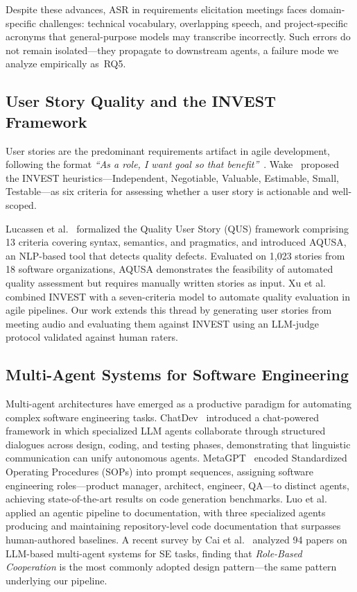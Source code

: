 \documentclass[sigconf]{acmart}
\begin{document}
Despite these advances, ASR in requirements elicitation meetings faces
domain-specific challenges: technical vocabulary, overlapping speech,
and project-specific acronyms that general-purpose models may
transcribe incorrectly. Such errors do not remain isolated—they
propagate to downstream agents, a failure mode we analyze empirically
as~RQ5.

\subsection{User Story Quality and the INVEST Framework}

User stories are the predominant requirements artifact in agile
development, following the format \textit{``As a role, I want goal so
that benefit''}~\cite{lucassen2016qus}. Wake~\cite{wake2003invest}
proposed the INVEST heuristics—Independent, Negotiable, Valuable,
Estimable, Small, Testable—as six criteria for assessing whether a
user story is actionable and well-scoped.

Lucassen et al.~\cite{lucassen2016qus} formalized the Quality User
Story (QUS) framework comprising 13 criteria covering syntax,
semantics, and pragmatics, and introduced AQUSA, an NLP-based tool
that detects quality defects. Evaluated on 1,023 stories from 18
software organizations, AQUSA demonstrates the feasibility of
automated quality assessment but requires manually written stories as
input. Xu et al.~\cite{xu2023requirement} combined INVEST with a
seven-criteria model to automate quality evaluation in agile
pipelines. Our work extends this thread by generating user stories
from meeting audio and evaluating them against INVEST using an
LLM-judge protocol validated against human raters.

\subsection{Multi-Agent Systems for Software Engineering}

Multi-agent architectures have emerged as a productive paradigm for
automating complex software engineering tasks. ChatDev~\cite{qian2024chatdev}
introduced a chat-powered framework in which specialized LLM agents
collaborate through structured dialogues across design, coding, and
testing phases, demonstrating that linguistic communication can
unify autonomous agents. MetaGPT~\cite{hong2024metagpt} encoded
Standardized Operating Procedures (SOPs) into prompt sequences,
assigning software engineering roles—product manager, architect,
engineer, QA—to distinct agents, achieving state-of-the-art results
on code generation benchmarks. Luo et al.~\cite{luo2024repoagent}
applied an agentic pipeline to documentation, with three specialized
agents producing and maintaining repository-level code documentation
that surpasses human-authored baselines. A recent survey by Cai et
al.~\cite{cai2025designing} analyzed 94 papers on LLM-based
multi-agent systems for SE tasks, finding that \textit{Role-Based
Cooperation} is the most commonly adopted design pattern—the same
pattern underlying our pipeline.
\end{document}
